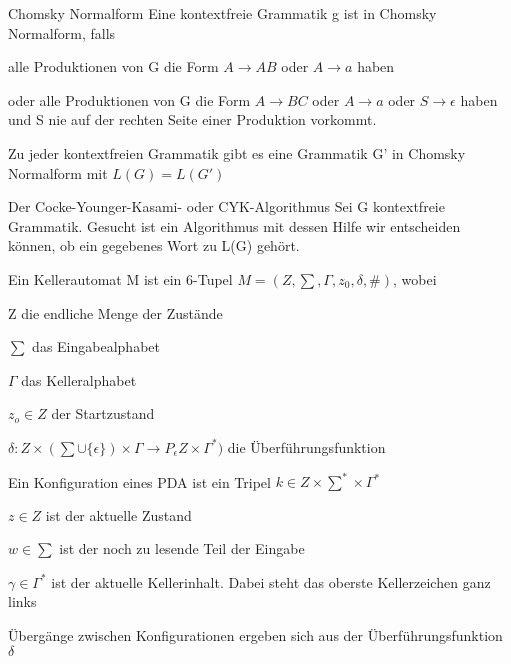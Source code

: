 \documentclass[avery5371, frame]{flashcards}
\begin{document}
\begin{flashcard}[Definition]{Chomsky Normalform} Eine kontextfreie Grammatik g ist in Chomsky Normalform, falls\begin{itemize*}
        \item alle Produktionen von G die Form $A\rightarrow AB$ oder $A\rightarrow a$ haben
        \item oder alle Produktionen von G die Form $A\rightarrow BC$ oder $A\rightarrow a$ oder $S\rightarrow\epsilon$ haben und S nie auf der rechten Seite einer Produktion vorkommt.
    \end{itemize*}
\end{flashcard}

\begin{flashcard}[Satz]{ Zu jeder kontextfreien Grammatik gibt es eine Grammatik G' in Chomsky Normalform mit} $L(G)=L(G')$
\end{flashcard}

\begin{flashcard}{Der Cocke-Younger-Kasami- oder CYK-Algorithmus}
    Sei G kontextfreie Grammatik.  Gesucht ist ein Algorithmus mit dessen Hilfe wir entscheiden können, ob ein gegebenes Wort zu L(G) gehört.
\end{flashcard}

\begin{flashcard}[Definition]{ Ein Kellerautomat} M ist ein 6-Tupel $M=(Z,\sum,\Gamma, z_0, \delta, \#)$, wobei\begin{itemize*}
        \item Z die endliche Menge der Zustände
        \item $\sum$ das Eingabealphabet
        \item $\Gamma$ das Kelleralphabet
        \item $z_o\in Z$ der Startzustand
        \item $\delta: Z \times (\sum \cup \{\epsilon\})\times \Gamma \rightarrow P_{\epsilon}Z\times\Gamma^*)$ die Überführungsfunktion
    \end{itemize*}
\end{flashcard}

\begin{flashcard}[Definition]{ Ein Konfiguration eines PDA}
    ist ein Tripel $k\in Z \times \sum^* \times \Gamma^*$
    \begin{itemize*}
        \item $z\in Z$ ist der aktuelle Zustand
        \item $w\in\sum$ ist der noch zu lesende Teil der Eingabe
        \item $\gamma \in \Gamma^*$ ist der aktuelle Kellerinhalt. Dabei steht das oberste Kellerzeichen ganz links
    \end{itemize*}
    Übergänge zwischen Konfigurationen ergeben sich aus der Überführungsfunktion $\delta$
\end{flashcard}
\end{document}
